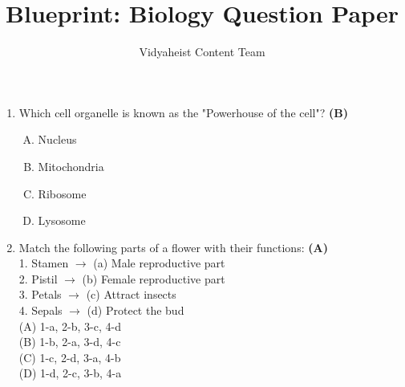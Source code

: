 \documentclass{article}
\begin{document}
\title{Blueprint: Biology Question Paper}
\author{Vidyaheist Content Team}
\date{}
\maketitle

\begin{enumerate}

    \item Which cell organelle is known as the "Powerhouse of the cell"? \hfill \textbf{(B)}
    \begin{enumerate}[(A)]
        \item Nucleus
        \item Mitochondria
        \item Ribosome
        \item Lysosome
    \end{enumerate}

    \item Match the following parts of a flower with their functions: \hfill \textbf{(A)}
    \\1. Stamen $\rightarrow$ (a) Male reproductive part
    \\2. Pistil $\rightarrow$ (b) Female reproductive part
    \\3. Petals $\rightarrow$ (c) Attract insects
    \\4. Sepals $\rightarrow$ (d) Protect the bud
    \\(A) 1-a, 2-b, 3-c, 4-d
    \\(B) 1-b, 2-a, 3-d, 4-c
    \\(C) 1-c, 2-d, 3-a, 4-b
    \\(D) 1-d, 2-c, 3-b, 4-a

\end{enumerate}
\end{document}
